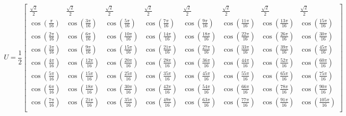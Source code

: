 \begin{equation}
U=\frac{1}{2}
\begin{bmatrix}
	\frac{\sqrt{2}}{2}	& \frac{\sqrt{2}}{2}		& \frac{\sqrt{2}}{2}		& \frac{\sqrt{2}}{2}		& \frac{\sqrt{2}}{2}		& \frac{\sqrt{2}}{2}		& \frac{\sqrt{2}}{2}		& \frac{\sqrt{2}}{2}		\\
	\cos(\frac{\pi}{16})		& \cos(\frac{3\pi}{16})	& \cos(\frac{5\pi}{16})	& \cos(\frac{7\pi}{16})	& \cos(\frac{9\pi}{16})	& \cos(\frac{11\pi}{16})	& \cos(\frac{13\pi}{16})	& \cos(\frac{15\pi}{16})		\\
	\cos(\frac{2\pi}{16})	& \cos(\frac{6\pi}{16})	& \cos(\frac{10\pi}{16})	& \cos(\frac{14\pi}{16})	& \cos(\frac{18\pi}{16})	& \cos(\frac{22\pi}{16})	& \cos(\frac{26\pi}{16})	& \cos(\frac{30\pi}{16})		\\
	\cos(\frac{3\pi}{16})	& \cos(\frac{9\pi}{16})	& \cos(\frac{15\pi}{16})	& \cos(\frac{21\pi}{16})	& \cos(\frac{27\pi}{16})	& \cos(\frac{33\pi}{16})	& \cos(\frac{39\pi}{16})	& \cos(\frac{45\pi}{16})		\\
	\cos(\frac{4\pi}{16})	& \cos(\frac{12\pi}{16})	& \cos(\frac{20\pi}{16})	& \cos(\frac{28\pi}{16})	& \cos(\frac{36\pi}{16})	& \cos(\frac{44\pi}{16})	& \cos(\frac{52\pi}{16})	& \cos(\frac{60\pi}{16})		\\
	\cos(\frac{5\pi}{16})	& \cos(\frac{15\pi}{16})	& \cos(\frac{25\pi}{16})	& \cos(\frac{35\pi}{16})	& \cos(\frac{45\pi}{16})	& \cos(\frac{55\pi}{16})	& \cos(\frac{65\pi}{16})	& \cos(\frac{75\pi}{16})		\\
	\cos(\frac{6\pi}{16})	& \cos(\frac{18\pi}{16})	& \cos(\frac{30\pi}{16})	& \cos(\frac{42\pi}{16})	& \cos(\frac{54\pi}{16})	& \cos(\frac{66\pi}{16})	& \cos(\frac{78\pi}{16})	& \cos(\frac{90\pi}{16})		\\
	\cos(\frac{7\pi}{16})	& \cos(\frac{21\pi}{16})	& \cos(\frac{35\pi}{16})	& \cos(\frac{49\pi}{16})	& \cos(\frac{63\pi}{16})	& \cos(\frac{77\pi}{16})	& \cos(\frac{91\pi}{16})	& \cos(\frac{105\pi}{16})	\\
\end{bmatrix}
\label{eq:DCTmatrix}
\end{equation}
